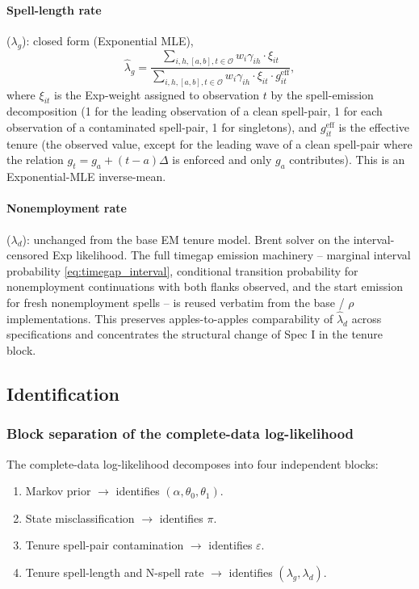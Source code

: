 \paragraph{Spell-length rate} (\(\lambda_g\)): closed form (Exponential MLE),
\begin{equation}
\hat\lambda_g = \frac{\sum_{i,h,[a,b],t\in\mathcal{O}} w_i \gamma_{ih} \cdot \xi_{it}}{\sum_{i,h,[a,b],t\in\mathcal{O}} w_i \gamma_{ih} \cdot \xi_{it} \cdot g_{it}^{\mathrm{eff}}},
\label{eq:lambda_g_mstep}
\end{equation}
where \(\xi_{it}\) is the Exp-weight assigned to observation \(t\) by the
spell-emission decomposition (1 for the leading observation of a clean
spell-pair, 1 for each observation of a contaminated spell-pair, 1 for
singletons), and \(g_{it}^{\mathrm{eff}}\) is the effective tenure (the
observed value, except for the leading wave of a clean spell-pair where
the relation \(g_t = g_a + (t-a)\Delta\) is enforced and only \(g_a\)
contributes). This is an Exponential-MLE inverse-mean.

\paragraph{Nonemployment rate} (\(\lambda_d\)): unchanged from the base EM tenure
model. Brent solver on the interval-censored Exp likelihood. The full
timegap emission machinery -- marginal interval probability
\eqref{eq:timegap_interval}, conditional transition probability for
nonemployment continuations with both flanks observed, and the start
emission for fresh nonemployment spells -- is reused verbatim from the
base / \(\rho\) implementations. This preserves apples-to-apples
comparability of \(\hat\lambda_d\) across specifications and concentrates
the structural change of Spec I in the tenure block.

\subsection{Identification}
\label{sec:identification_eps}

\subsubsection{Block separation of the complete-data log-likelihood}

The complete-data log-likelihood decomposes into four independent blocks:

\begin{enumerate}
\item Markov prior \(\rightarrow\) identifies \((\alpha,\theta_0,\theta_1)\).
\item State misclassification \(\rightarrow\) identifies \(\pi\).
\item Tenure spell-pair contamination \(\rightarrow\) identifies \(\varepsilon\).
\item Tenure spell-length and N-spell rate \(\rightarrow\) identifies
  \((\lambda_g, \lambda_d)\).
\end{enumerate}

